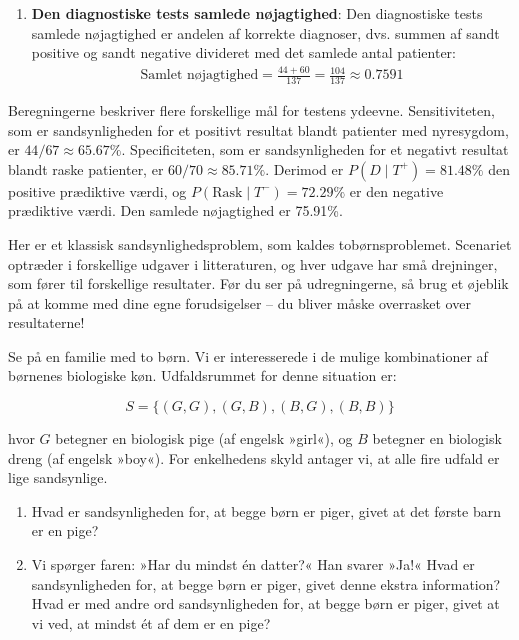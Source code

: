 \begin{solution}
\begin{enumerate}[label=(\alph*)]
        \item \textbf{Den diagnostiske tests samlede nøjagtighed}:
        Den diagnostiske tests samlede nøjagtighed er andelen af korrekte diagnoser, dvs. summen af sandt positive og sandt negative divideret med det samlede antal patienter:
        \begin{align*}
            \text{Samlet nøjagtighed} =\frac{44+60}{137}=\frac{104}{137} \approx 0.7591
        \end{align*}
    \end{enumerate}


Beregningerne beskriver flere forskellige mål for testens ydeevne. Sensitiviteten, som er sandsynligheden for et positivt resultat blandt patienter med nyresygdom, er \(44/67\approx65.67\%\). Specificiteten, som er sandsynligheden for et negativt resultat blandt raske patienter, er \(60/70\approx85.71\%\). Derimod er \(P(D\mid T^+)=81.48\%\) den positive prædiktive værdi, og \(P(\text{Rask}\mid T^-)=72.29\%\) er den negative prædiktive værdi. Den samlede nøjagtighed er 75.91\%.
\end{solution}

Her er et klassisk sandsynlighedsproblem, som kaldes tobørnsproblemet. Scenariet optræder i forskellige udgaver i litteraturen, og hver udgave har små drejninger, som fører til forskellige resultater. Før du ser på udregningerne, så brug et øjeblik på at komme med dine egne forudsigelser -- du bliver måske overrasket over resultaterne!

\begin{example}
    Se på en familie med to børn. Vi er interesserede i de mulige kombinationer af børnenes biologiske køn. Udfaldsrummet for denne situation er:

\[
S = \{(G, G), (G, B), (B, G), (B, B)\}
\]

hvor \( G \) betegner en biologisk pige (af engelsk »girl«), og \( B \) betegner en biologisk dreng (af engelsk »boy«). For enkelhedens skyld antager vi, at alle fire udfald er lige sandsynlige.

\begin{enumerate}[label=(\alph*)]
    \item Hvad er sandsynligheden for, at begge børn er piger, givet at det første barn er en pige?
    \item Vi spørger faren: »Har du mindst én datter?« Han svarer »Ja!« Hvad er sandsynligheden for, at begge børn er piger, givet denne ekstra information? Hvad er med andre ord sandsynligheden for, at begge børn er piger, givet at vi ved, at mindst ét af dem er en pige?
\end{enumerate}
\end{example}

